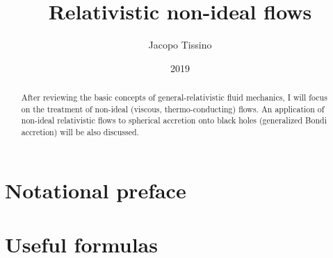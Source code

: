 \documentclass[a4paper, 11pt]{article}
\title{Relativistic non-ideal flows}
\author{Jacopo Tissino}
\date{2019}
\begin{document}


\begin{abstract}
After reviewing the basic concepts of general-relativistic fluid mechanics, I will focus on the treatment of non-ideal
(viscous, thermo-conducting) flows. An application of non-ideal relativistic flows to spherical accretion onto black holes
(generalized Bondi accretion) will be also discussed.
\end{abstract}

\section{Notational preface} \label{sec:notational-preface}


\section{Useful formulas}


% 
%
% 
%
% 

\printbibliography[title={Bibliography}]

\end{document}
